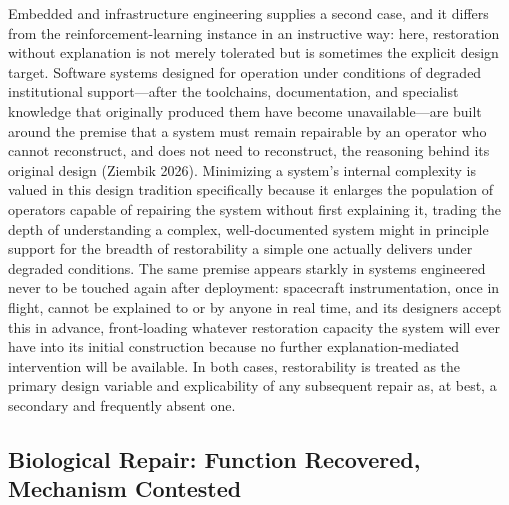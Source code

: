\documentclass[11pt]{article}
\theoremstyle{plain}
\begin{document}
Embedded and infrastructure engineering supplies a second case, and it differs from the reinforcement-learning instance in an instructive way: here, restoration without explanation is not merely tolerated but is sometimes the explicit design target. Software systems designed for operation under conditions of degraded institutional support---after the toolchains, documentation, and specialist knowledge that originally produced them have become unavailable---are built around the premise that a system must remain repairable by an operator who cannot reconstruct, and does not need to reconstruct, the reasoning behind its original design (Ziembik 2026). Minimizing a system's internal complexity is valued in this design tradition specifically because it enlarges the population of operators capable of repairing the system without first explaining it, trading the depth of understanding a complex, well-documented system might in principle support for the breadth of restorability a simple one actually delivers under degraded conditions. The same premise appears starkly in systems engineered never to be touched again after deployment: spacecraft instrumentation, once in flight, cannot be explained to or by anyone in real time, and its designers accept this in advance, front-loading whatever restoration capacity the system will ever have into its initial construction because no further explanation-mediated intervention will be available. In both cases, restorability is treated as the primary design variable and explicability of any subsequent repair as, at best, a secondary and frequently absent one.

\subsection{Biological Repair: Function Recovered, Mechanism Contested}
\end{document}
